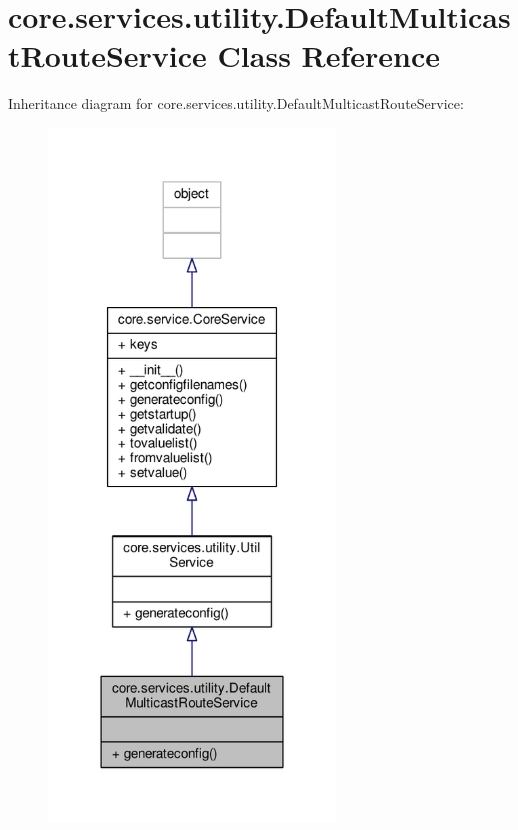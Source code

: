 \hypertarget{classcore_1_1services_1_1utility_1_1_default_multicast_route_service}{\section{core.\+services.\+utility.\+Default\+Multicast\+Route\+Service Class Reference}
\label{classcore_1_1services_1_1utility_1_1_default_multicast_route_service}
}


Inheritance diagram for core.\+services.\+utility.\+Default\+Multicast\+Route\+Service\+:
\nopagebreak
\begin{figure}[H]
\begin{center}
\leavevmode
\includegraphics[width=216pt]{classcore_1_1services_1_1utility_1_1_default_multicast_route_service__inherit__graph}
\end{center}
\end{figure}


